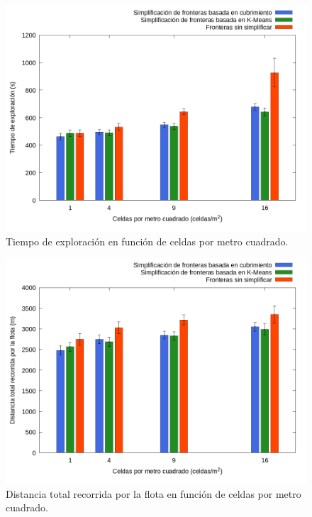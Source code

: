 \begin{figure}[H]
  \centerfloat

  \includegraphics[clip=true, width=\graphlen]{imagenes/graficas_chicas/graficas_histo_num/ident_obj/exploration_time.png}

  \caption{Tiempo de exploración en función de celdas por metro cuadrado.}\label{fig:gra:idobj:et}

\end{figure}

\begin{figure}[H]
  \centerfloat

  \includegraphics[clip=true, width=\graphlen]{imagenes/graficas_chicas/graficas_histo_num/ident_obj/exploration_cost.png}

  \caption{Distancia total recorrida por la flota en función de celdas por metro cuadrado.}\label{fig:gra:idobj:ec}

\end{figure}

